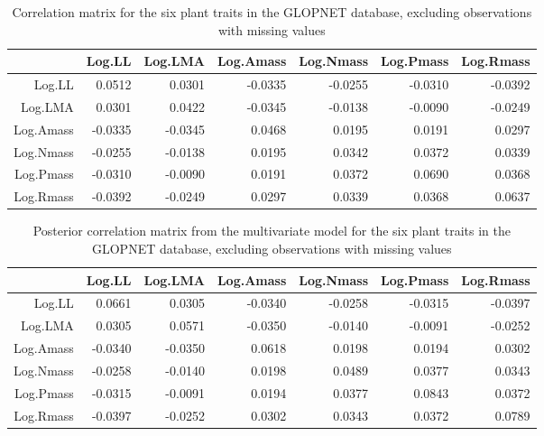 \documentclass[12pt,fleqn]{article}
\begin{document}
\begin{table}[ht]
\centering
\caption{Correlation matrix for the six plant traits in the GLOPNET database, excluding observations with missing values}

\begin{tabular}{rrrrrrr}
  \hline
 & Log.LL & Log.LMA & Log.Amass & Log.Nmass & Log.Pmass & Log.Rmass \\ 
  \hline
Log.LL & 0.0512 & 0.0301 & -0.0335 & -0.0255 & -0.0310 & -0.0392 \\ 
  Log.LMA & 0.0301 & 0.0422 & -0.0345 & -0.0138 & -0.0090 & -0.0249 \\ 
  Log.Amass & -0.0335 & -0.0345 & 0.0468 & 0.0195 & 0.0191 & 0.0297 \\ 
  Log.Nmass & -0.0255 & -0.0138 & 0.0195 & 0.0342 & 0.0372 & 0.0339 \\ 
  Log.Pmass & -0.0310 & -0.0090 & 0.0191 & 0.0372 & 0.0690 & 0.0368 \\ 
  Log.Rmass & -0.0392 & -0.0249 & 0.0297 & 0.0339 & 0.0368 & 0.0637 \\ 
   \hline\end{tabular}
\end{table}

\begin{table}[ht]
\centering
\caption{Posterior correlation matrix from the multivariate model for the six plant traits in the GLOPNET database, excluding observations with missing values}

\begin{tabular}{rrrrrrr}
  \hline
 & Log.LL & Log.LMA & Log.Amass & Log.Nmass & Log.Pmass & Log.Rmass \\ 
  \hline
Log.LL & 0.0661 & 0.0305 & -0.0340 & -0.0258 & -0.0315 & -0.0397 \\ 
  Log.LMA & 0.0305 & 0.0571 & -0.0350 & -0.0140 & -0.0091 & -0.0252 \\ 
  Log.Amass & -0.0340 & -0.0350 & 0.0618 & 0.0198 & 0.0194 & 0.0302 \\ 
  Log.Nmass & -0.0258 & -0.0140 & 0.0198 & 0.0489 & 0.0377 & 0.0343 \\ 
  Log.Pmass & -0.0315 & -0.0091 & 0.0194 & 0.0377 & 0.0843 & 0.0372 \\ 
  Log.Rmass & -0.0397 & -0.0252 & 0.0302 & 0.0343 & 0.0372 & 0.0789 \\ 
   \hline
\end{tabular}
\end{table}
\end{document}
